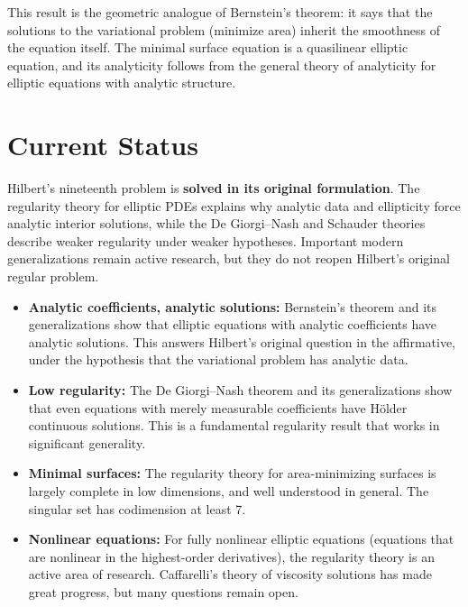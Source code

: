 This result is the geometric analogue of Bernstein's theorem: it says that the solutions to the variational problem (minimize area) inherit the smoothness of the equation itself. The minimal surface equation is a quasilinear elliptic equation, and its analyticity follows from the general theory of analyticity for elliptic equations with analytic structure.

\section{Current Status}

\begin{solvedbox}
Hilbert's nineteenth problem is \textbf{solved in its original formulation}. The regularity theory for elliptic PDEs explains why analytic data and ellipticity force analytic interior solutions, while the De Giorgi--Nash and Schauder theories describe weaker regularity under weaker hypotheses. Important modern generalizations remain active research, but they do not reopen Hilbert's original regular problem.

\begin{itemize}
    \item \textbf{Analytic coefficients, analytic solutions:} Bernstein's theorem and its generalizations show that elliptic equations with analytic coefficients have analytic solutions. This answers Hilbert's original question in the affirmative, under the hypothesis that the variational problem has analytic data.

    \item \textbf{Low regularity:} The De Giorgi--Nash theorem and its generalizations show that even equations with merely measurable coefficients have H\"older continuous solutions. This is a fundamental regularity result that works in significant generality.

    \item \textbf{Minimal surfaces:} The regularity theory for area-minimizing surfaces is largely complete in low dimensions, and well understood in general. The singular set has codimension at least 7.

    \item \textbf{Nonlinear equations:} For fully nonlinear elliptic equations (equations that are nonlinear in the highest-order derivatives), the regularity theory is an active area of research. Caffarelli's theory of viscosity solutions has made great progress, but many questions remain open.


\end{itemize}
\end{solvedbox}
